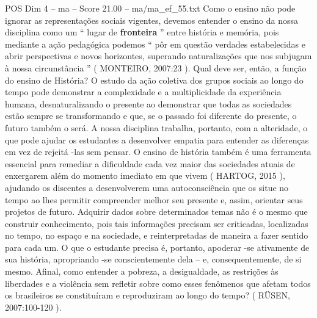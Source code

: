 \begin{textsample}{POS Dim 4 – ma – Score 21.00 – ma/ma\_ef\_55.txt}
Como o ensino não pode ignorar as representações sociais vigentes, devemos entender o ensino da nossa disciplina como um “ lugar de \textbf{fronteira} ” entre história e memória, pois mediante a ação pedagógica podemos “ pôr em questão verdades estabelecidas e abrir perspectivas e novos horizontes, superando naturalizações que nos subjugam à nossa circunstância ” ( MONTEIRO, 2007:23 ).
Qual deve ser, então, a função do ensino de História?
O estudo da ação coletiva dos grupos sociais ao longo do tempo pode demonstrar a complexidade e a multiplicidade da experiência humana, desnaturalizando o presente ao demonstrar que todas as sociedades estão sempre se transformando e que, se o passado foi diferente do presente, o futuro também o será.
A nossa disciplina trabalha, portanto, com a alteridade, o que pode ajudar os estudantes a desenvolver empatia para entender as diferenças em vez de rejeitá -las sem pensar.
O ensino de história também é uma ferramenta essencial para remediar a dificuldade cada vez maior das sociedades atuais de enxergarem além do momento imediato em que vivem ( HARTOG, 2015 ), ajudando os discentes a desenvolverem uma autoconsciência que os situe no tempo ao lhes permitir compreender melhor seu presente e, assim, orientar seus projetos de futuro.
Adquirir dados sobre determinados temas não é o mesmo que construir conhecimento, pois tais informações precisam ser criticadas, localizadas no tempo, no espaço e na sociedade, e reinterpretadas de maneira a fazer sentido para cada um.
O que o estudante precisa é, portanto, apoderar -se ativamente de sua história, apropriando -se conscientemente dela – e, consequentemente, de si mesmo.
Afinal, como entender a pobreza, a desigualdade, as restrições às liberdades e a violência sem refletir sobre como esses fenômenos que afetam todos os brasileiros se constituíram e reproduziram ao longo do tempo? ( RÜSEN, 2007:100-120 ).

\end{textsample}
